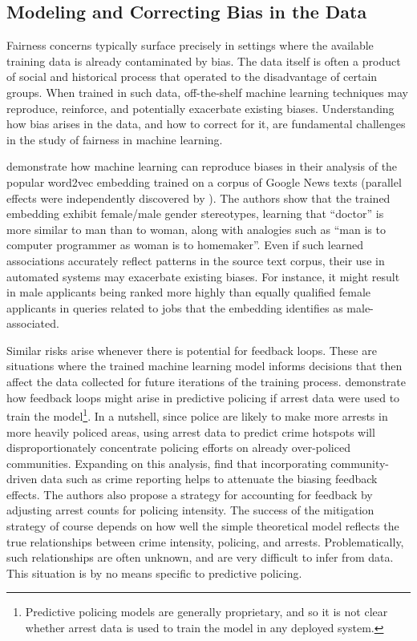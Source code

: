 \subsection{Modeling and Correcting Bias in the Data}

Fairness concerns typically surface precisely in settings where the available training data is already contaminated by bias.  The data itself is often a product of social and historical process that operated to the disadvantage of certain groups.   When trained in such data, off-the-shelf machine learning techniques may reproduce, reinforce, and potentially exacerbate existing biases.  Understanding how bias arises in the data, and how to correct for it, are fundamental challenges in the study of fairness in machine learning.

\cite{bolukbasi2016man} demonstrate how machine learning can reproduce biases in their analysis of the popular word2vec embedding trained on a corpus of Google News texts (parallel effects were independently discovered by \cite{CBN17}).  The authors show that the trained embedding exhibit female/male gender stereotypes, learning that ``doctor'' is more similar to man than to woman, along with analogies such as ``man is to computer programmer as woman is to homemaker''.  Even if such learned associations accurately reflect patterns in the source text corpus, their use in automated systems may exacerbate existing biases.   For instance, it might result in male applicants being ranked more highly than equally qualified female applicants in queries related to jobs that the embedding identifies as male-associated.

Similar risks arise whenever there is potential for feedback loops.  These are situations where the trained machine learning model informs decisions that then affect the data collected for future iterations of the training process.  \cite{lum2016predict} demonstrate how feedback loops might arise in predictive policing if arrest data were used to train the model\footnote{Predictive policing models are generally proprietary, and so it is not clear whether arrest data is used to train the model in any deployed system.}.  In a nutshell, since police are likely to make more arrests in more heavily policed areas, using arrest data to predict crime hotspots will disproportionately concentrate policing efforts on already over-policed communities.  Expanding on this analysis, \cite{ensign2018runawayfeedbackloops} find that incorporating community-driven data such as crime reporting helps to attenuate the biasing feedback effects. The authors also propose a strategy for accounting for feedback by adjusting arrest counts for policing intensity.  The success of the mitigation strategy of course depends on how well the simple theoretical model reflects the true relationships between crime intensity, policing, and arrests.  Problematically, such relationships are often  unknown, and are very difficult to infer from data.   This situation is by no means specific to predictive policing.

